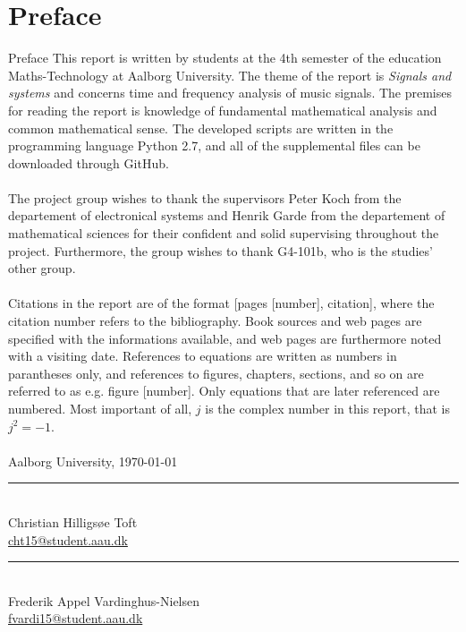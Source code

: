 \clearpage
\chapter*{Preface}
{Preface}
This report is written by students at the 4th semester of the education Maths-Technology at Aalborg University. The theme of the report is \textit{Signals and systems} and concerns time and frequency analysis of music signals. The premises for reading the report is knowledge of fundamental mathematical analysis and common mathematical sense. The developed scripts are written in the programming language Python 2.7, and all of the supplemental files can be downloaded through GitHub.
\\ \\
The project group wishes to thank the supervisors Peter Koch from the departement of electronical systems and Henrik Garde from the departement of mathematical sciences for their confident and solid supervising throughout the project. Furthermore, the group wishes to thank G4-101b, who is the studies' other group.
\\ \\
Citations in the report are of the format [pages [number], citation], where the citation number refers to the bibliography. Book sources and web pages are specified with the informations available, and web pages are furthermore noted with a visiting date. References to equations are written as numbers in parantheses only, and references to figures, chapters, sections, and so on are referred to as e.g. figure [number]. Only equations that are later referenced are numbered. Most important of all, $j$ is the complex number in this report, that is $j^2 = -1$.
\\ \\
\vspace{\baselineskip}\hfill Aalborg University, \today
\vfill\noindent
\begin{minipage}[b]{0.45\textwidth}
 \centering
 \rule{\textwidth}{0.5pt}\\
Christian Hilligsøe Toft\\
 {\footnotesize \href{mailto:cht15@student.aau.dk}{cht15@student.aau.dk}}  
\end{minipage}
\hfill
\begin{minipage}[b]{0.45\textwidth}
 \centering
 \rule{\textwidth}{0.5pt}\\
Frederik Appel Vardinghus-Nielsen\\
 {\footnotesize \href{mailto:fvardi15@student.aau.dk}{fvardi15@student.aau.dk}}
\end{minipage}
